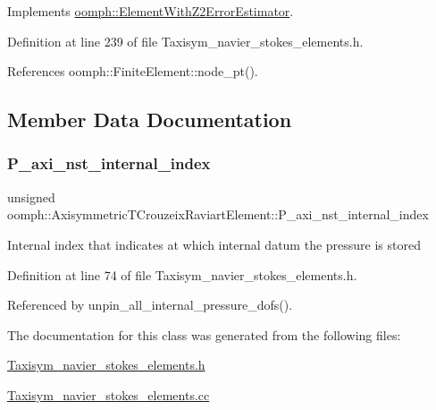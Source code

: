 Implements \hyperlink{classoomph_1_1ElementWithZ2ErrorEstimator_a0eedccc33519f852c5dc2055ddf2774b}{oomph\+::\+Element\+With\+Z2\+Error\+Estimator}.



Definition at line 239 of file Taxisym\+\_\+navier\+\_\+stokes\+\_\+elements.\+h.



References oomph\+::\+Finite\+Element\+::node\+\_\+pt().



\subsection{Member Data Documentation}
\mbox{\label{classoomph_1_1AxisymmetricTCrouzeixRaviartElement_a05fdb096aa13072e690e30337ff91ff6}} 
\subsubsection{\texorpdfstring{P\+\_\+axi\+\_\+nst\+\_\+internal\+\_\+index}{P\_axi\_nst\_internal\_index}}
{\footnotesize\ttfamily unsigned oomph\+::\+Axisymmetric\+T\+Crouzeix\+Raviart\+Element\+::\+P\+\_\+axi\+\_\+nst\+\_\+internal\+\_\+index\hspace{0.3cm}{\ttfamily [protected]}}

Internal index that indicates at which internal datum the pressure is stored 

Definition at line 74 of file Taxisym\+\_\+navier\+\_\+stokes\+\_\+elements.\+h.



Referenced by unpin\+\_\+all\+\_\+internal\+\_\+pressure\+\_\+dofs().



The documentation for this class was generated from the following files\+:\begin{DoxyCompactItemize}
\item 
\hyperlink{Taxisym__navier__stokes__elements_8h}{Taxisym\+\_\+navier\+\_\+stokes\+\_\+elements.\+h}\item 
\hyperlink{Taxisym__navier__stokes__elements_8cc}{Taxisym\+\_\+navier\+\_\+stokes\+\_\+elements.\+cc}\end{DoxyCompactItemize}
